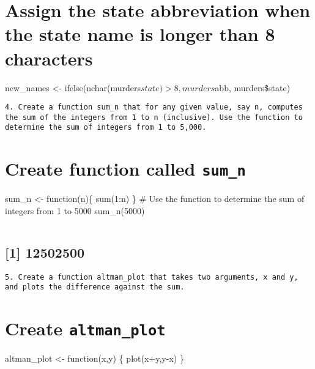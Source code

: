 \documentclass[
]{article}
\begin{document}
\hypertarget{assign-the-state-abbreviation-when-the-state-name-is-longer-than-8-characters}{%
\section{Assign the state abbreviation when the state name is longer
than 8
characters}\label{assign-the-state-abbreviation-when-the-state-name-is-longer-than-8-characters}}

new\_names \textless- ifelse(nchar(murders\(state)>8, murders\)abb,
murders\$state)

\begin{verbatim}
4. Create a function sum_n that for any given value, say n, computes the sum of the integers from 1 to n (inclusive). Use the function to determine the sum of integers from 1 to 5,000.
\end{verbatim}

\hypertarget{create-function-called-sum_n}{%
\section{\texorpdfstring{Create function called
\texttt{sum\_n}}{Create function called sum\_n}}\label{create-function-called-sum_n}}

sum\_n \textless- function(n)\{ sum(1:n) \} \# Use the function to
determine the sum of integers from 1 to 5000 sum\_n(5000)

\begin{verbatim}
\end{verbatim}

\hypertarget{section-3}{%
\subsection{{[}1{]} 12502500}\label{section-3}}

\begin{verbatim}
5. Create a function altman_plot that takes two arguments, x and y, and plots the difference against the sum.
\end{verbatim}

\hypertarget{create-altman_plot}{%
\section{\texorpdfstring{Create
\texttt{altman\_plot}}{Create altman\_plot}}\label{create-altman_plot}}

altman\_plot \textless- function(x,y) \{ plot(x+y,y-x) \}
\end{document}
